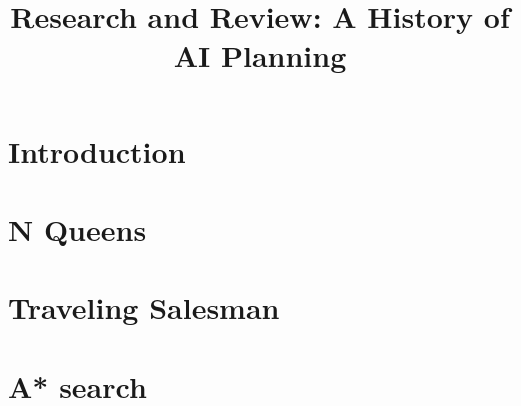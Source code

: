 \documentclass[11pt]{article}
\title{\textbf{Research and Review: A History of AI Planning}}
\begin{document}
\maketitle

\newpage

\section{Introduction}


\section{N Queens}


\section{Traveling Salesman}


\section{A* search}




\end{document}
